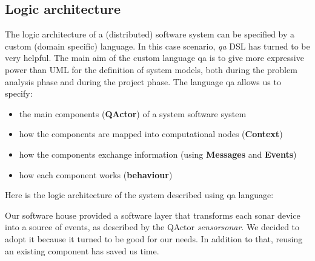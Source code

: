 \subsection{Logic architecture}
The logic architecture of a (distributed) software system can be specified by a custom (domain specific) language. In this case scenario, \textit{qa} DSL has turned to be very helpful. The main aim of the custom language qa is to give more expressive power than UML for the definition of system models, both during the problem analysis phase and during the project phase. The language qa allows us to specify:
\begin{itemize}
	\item the main components (\textbf{QActor}) of a system software system
	\item how the components are mapped into computational nodes (\textbf{Context})
	\item how the components exchange information (using \textbf{Messages} and \textbf{Events})
	\item how each component works (\textbf{behaviour})
\end{itemize}
Here is the logic architecture of the system described using qa language:

Our software house provided a software layer that transforms each sonar device into a source of events, as described by the QActor \textit{sensorsonar}. We decided to adopt it because it turned to be good for our needs. In addition to that, reusing an existing component has saved us time.